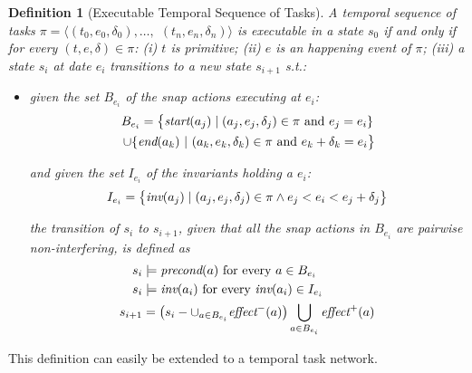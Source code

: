 \documentclass[letterpaper]{article} %
\newtheorem{definition}{Definition}
\newcommand{\pre}{\text{\it precond}}
\newcommand{\add}{\text{\it effect}^{+}}
\newcommand{\del}{\text{\it effect}^{-}}
\newcommand{\tstart}{\text{\it start}}
\newcommand{\tend}{\text{\it end}}
\newcommand{\tinv}{\text{\it inv}}
\begin{document}
\begin{definition}[Executable Temporal Sequence of Tasks]
  A temporal sequence of tasks $\pi = \langle (t_0, e_0, \delta_0), \ldots,$ $(t_n, e_n, \delta_n) \rangle$ is executable in a state $s_0$ if and only if for every $(t, e, \delta) \in \pi$:
  (i) $t$ is primitive;
  (ii) $e$ is an happening event of $\pi$;
  (iii) %
  a state $s_i$ at date $e_i$ transitions to a new state $s_{i+1}$ s.t.: 
\begin{itemize}
  \item given the set  $B_{e_i}$ of the snap actions executing at $e_i$:
    \begin{multline*}
      B_{e_i} = \bigl\{ \tstart(a_j) \; | \;  (a_j, e_j, \delta_j) \in \pi \text{ and } e_j = e_i \}\\
      \; \cup  \{\tend(a_k) \ | \ (a_k, e_k, \delta_k) \in \pi \text{ and } e_k + \delta_k = e_i\bigr\}
    \end{multline*}
    
 and given the set $I_{e_i}$ of the invariants holding a $e_i$:
    \begin{equation*}
      I_{e_i} = \bigl\{ \tinv(a_j) \; | \; (a_j, e_j, \delta_j) \in \pi \wedge e_j < e_i < e_j + \delta_j\bigr\}
    \end{equation*}

    the transition of $s_i$ to  $s_{i+1}$, given that all the snap actions in $B_{e_i}$ are \emph{pairwise non-interfering}, is defined as   %
      \begin{align*}
       s_i& \models \pre(a) \text{ for every } a \in B_{e_i}\\
       s_i& \models \tinv(a_i) \text{ for every }\tinv(a_i) \in I_{e_i}\\
       s_{i+1}& = \left(s_i - \cup_{a \in B_{e_i}} \del(a)\right) \bigcup_{a \in B_{e_i}} \add(a)       
      \end{align*}
\end{itemize}
\end{definition}


 This definition can easily be extended to a temporal task network.
\end{document}
